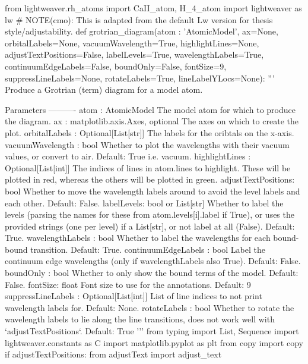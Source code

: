 \begin{pycode}[FlareObs]
from lightweaver.rh_atoms import CaII_atom, H_4_atom
import lightweaver as lw
# NOTE(cmo): This is adapted from the default Lw version for thesis style/adjustability.
def grotrian_diagram(atom : 'AtomicModel', ax=None, orbitalLabels=None,
                     vacuumWavelength=True, highlightLines=None, adjustTextPositions=False,
                     labelLevels=True, wavelengthLabels=True, continuumEdgeLabels=False,
                     boundOnly=False, fontSize=9, suppressLineLabels=None, rotateLabels=True,
                     lineLabelYLocs=None):
    '''
    Produce a Grotrian (term) diagram for a model atom.

    Parameters
    ----------
    atom : AtomicModel
        The model atom for which to produce the diagram.
    ax : matplotlib.axis.Axes, optional
        The axes on which to create the plot.
    orbitalLabels : Optional[List[str]]
        The labels for the oribtals on the x-axis.
    vacuumWavelength : bool
        Whether to plot the wavelengths with their vacuum values, or convert
        to air. Default: True i.e. vacuum.
    highlightLines : Optional[List[int]]
        The indices of lines in atom.lines to highlight. These will be
        plotted in red, whereas the others will be plotted in green.
    adjustTextPositions: bool
        Whether to move the wavelength labels around to avoid the level
        labels and each other. Default: False.
    labelLevels: bool or List[str]
        Whether to label the levels (parsing the names for these from
        atom.levels[i].label if True), or uses the provided strings (one per
        level) if a List[str], or not label at all (False). Default: True.
    wavelengthLabels : bool
        Whether to label the wavelengths for each bound-bound transition.
        Default: True.
    continuumEdgeLabels : bool
        Label the continuum edge wavelengths (only if wavelengthLabels also True).
        Default: False.
    boundOnly : bool
        Whether to only show the bound terms of the model.
        Default: False.
    fontSize: float
        Font size to use for the annotations. Default: 9
    suppressLineLabels : Optional[List[int]]
        List of line indices to not print wavelength labels for. Default: None.
    rotateLabels : bool
        Whether to rotate the wavelength labels to lie along the line
        transitions, does not work well with `adjustTextPositions`. Default: True
    '''
    from typing import List, Sequence
    import lightweaver.constants as C
    import matplotlib.pyplot as plt
    from copy import copy
    if adjustTextPositions:
        from adjustText import adjust_text


\end{pycode}
